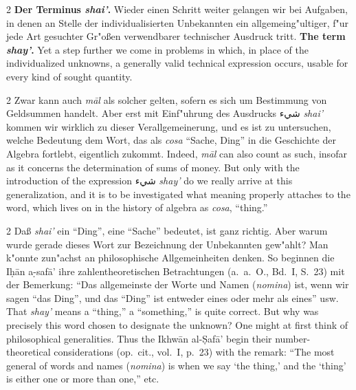 \documentclass[10pt,a4paper]{article}
\renewcommand{\switchcolumn}{\syncronize\nointerlineskip\columnbreak}
\newcommand{\RL}[1]{\beginR#1\endR}
\newcommand{\ar}[1]{{\arabicfont\RL{#1}}}
\newcommand{\s}[1]{\d{#1}}
\newcommand{\hw}{\d{h}}
\newcommand{\enquote}[1]{``#1''}
\begin{document}
\begin{paracol}{2}
\textbf{Der Terminus \textit{shai'}.} Wieder einen Schritt weiter gelangen wir bei Aufgaben, in denen an Stelle der individualisierten Unbekannten ein allgemeing"ultiger, f"ur jede Art gesuchter Gr"o\ss{}en verwendbarer technischer Ausdruck tritt.
\switchcolumn
\textbf{The term \textit{shay'}.} Yet a step further we come in problems in which, in place of the individualized unknowns, a generally valid technical expression occurs, usable for every kind of sought quantity.
\end{paracol}

\begin{paracol}{2}
Zwar kann auch \textit{m\=al} als solcher gelten, sofern es sich um Bestimmung von Geldsummen handelt. Aber erst mit Einf"uhrung des Ausdrucks \ar{شيء} \textit{shai'} kommen wir wirklich zu dieser Verallgemeinerung, und es ist zu untersuchen, welche Bedeutung dem Wort, das als \textit{cosa} \enquote{Sache, Ding} in die Geschichte der Algebra fortlebt, eigentlich zukommt.
\switchcolumn
Indeed, \textit{m\=al} can also count as such, insofar as it concerns the determination of sums of money. But only with the introduction of the expression \ar{شيء} \textit{shay'} do we really arrive at this generalization, and it is to be investigated what meaning properly attaches to the word, which lives on in the history of algebra as \textit{cosa}, ``thing.''
\end{paracol}

\begin{paracol}{2}
Da\ss{} \textit{shai'} ein \enquote{Ding}, eine \enquote{Sache} bedeutet, ist ganz richtig. Aber warum wurde gerade dieses Wort zur Bezeichnung der Unbekannten gew"ahlt? Man k"onnte zun"achst an philosophische Allgemeinheiten denken. So beginnen die I\hw{}\=an a\s-s{}af\=a' ihre zahlentheoretischen Betrachtungen (a.\ a.\ O., Bd.\ I, S.\ 23) mit der Bemerkung: \enquote{Das allgemeinste der Worte und Namen (\textit{nomina}) ist, wenn wir sagen \enquote{das Ding}, und das \enquote{Ding} ist entweder eines oder mehr als eines} usw.
\switchcolumn
That \textit{shay'} means a ``thing,'' a ``something,'' is quite correct. But why was precisely this word chosen to designate the unknown? One might at first think of philosophical generalities. Thus the Ikhw\=an al-\d{S}af\=a' begin their number-theoretical considerations (op.\ cit., vol.\ I, p.\ 23) with the remark: ``The most general of words and names (\textit{nomina}) is when we say `the thing,' and the `thing' is either one or more than one,'' etc.
\end{paracol}
\end{document}
